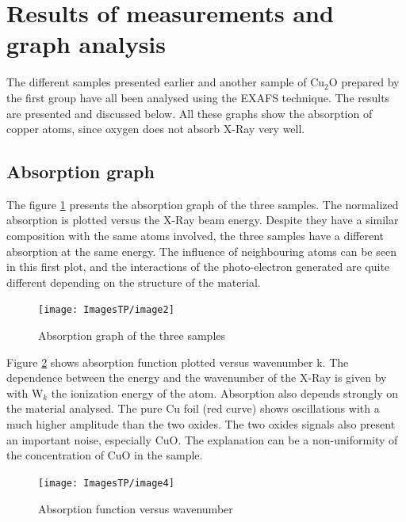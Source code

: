 \documentclass[11pt,a4paper,oneside]{report}
\begin{document}
\section{Results of measurements and graph analysis} \label{results}

The different samples presented earlier and another sample of Cu$_2$O prepared by the first group have all been analysed using the EXAFS technique. The results are presented and discussed below. All these graphs show the absorption of copper atoms, since oxygen does not absorb X-Ray very well.

\subsection{Absorption graph}
The figure \ref{graph1} presents the absorption graph of the three samples. The normalized absorption is plotted versus the X-Ray beam energy. Despite they have a similar composition with the same atoms involved, the three samples have a different absorption at the same energy. The influence of neighbouring atoms can be seen in this first plot, and the interactions of the photo-electron generated are quite different depending on the structure of the material.
\begin{figure}[H]
    \begin{center}
        \texttt{[image: ImagesTP/image2]}
        \caption{Absorption graph of the three samples}
        \label{graph1}
    \end{center}
\end{figure}

Figure \ref{graph2} shows absorption function plotted versus wavenumber k. The dependence between the energy and the wavenumber of the X-Ray is given by with W$_k$ the ionization energy of the atom.
Absorption also depends strongly on the material analysed. The pure Cu foil (red curve) shows oscillations with a much higher amplitude than the two oxides. The two oxides signals also present an important noise, especially CuO. The explanation can be a non-uniformity of the concentration of CuO in the sample.
\begin{figure}[H]
    \begin{center}
        \texttt{[image: ImagesTP/image4]}
        \caption{Absorption function versus wavenumber}
        \label{graph2}
    \end{center}
\end{figure}
\end{document}
